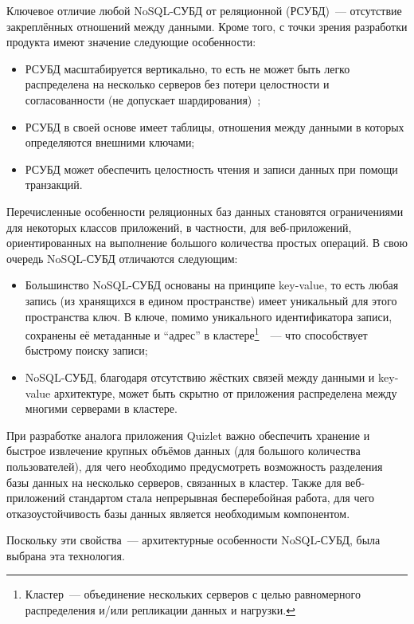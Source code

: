 \documentclass[14pt]{matmex-diploma-custom}
\begin{document}
Ключевое отличие любой NoSQL-СУБД от реляционной (РСУБД)~--- отсутствие закреплённых отношений между данными. Кроме того, с точки зрения разработки продукта имеют значение следующие особенности:
\begin{itemize}
    \item РСУБД масштабируется вертикально, то есть не может быть легко распределена на несколько серверов без потери целостности и согласованности (не допускает шардирования)~\cite{tkconf};
    \item РСУБД в своей основе имеет таблицы, отношения между данными в которых определяются внешними ключами;
    \item РСУБД может обеспечить целостность чтения и записи данных при помощи транзакций.
\end{itemize}
\sloppy
Перечисленные особенности реляционных баз данных становятся ограничениями для некоторых классов приложений, в частности, для веб-приложений, ориентированных на выполнение большого количества простых операций. В свою очередь NoSQL-СУБД отличаются следующим:
\begin{itemize}
    \item Большинство NoSQL-СУБД основаны на принципе key-value, то есть любая запись (из хранящихся в едином пространстве) имеет уникальный для этого пространства ключ. В ключе, помимо уникального идентификатора записи, сохранены её метаданные и ``адрес'' в кластере\footnote{Кластер~--- объединение нескольких серверов с целью равномерного распределения и/или репликации данных и нагрузки.}~\cite{aero:key}~--- что способствует быстрому поиску записи;
    \item NoSQL-СУБД, благодаря отсутствию жёстких связей между данными и key-value архитектуре, может быть скрытно от приложения распределена между многими серверами в кластере.
\end{itemize}
При разработке аналога приложения Quizlet важно обеспечить хранение и быстрое извлечение крупных объёмов данных (для большого количества пользователей), для чего необходимо предусмотреть возможность разделения базы данных на несколько серверов, связанных в кластер. Также для веб-приложений стандартом стала непрерывная бесперебойная работа, для чего отказоустойчивость базы данных является необходимым компонентом.

\sloppy
Поскольку эти свойства~--- архитектурные особенности NoSQL-СУБД, была выбрана эта технология.
\end{document}
